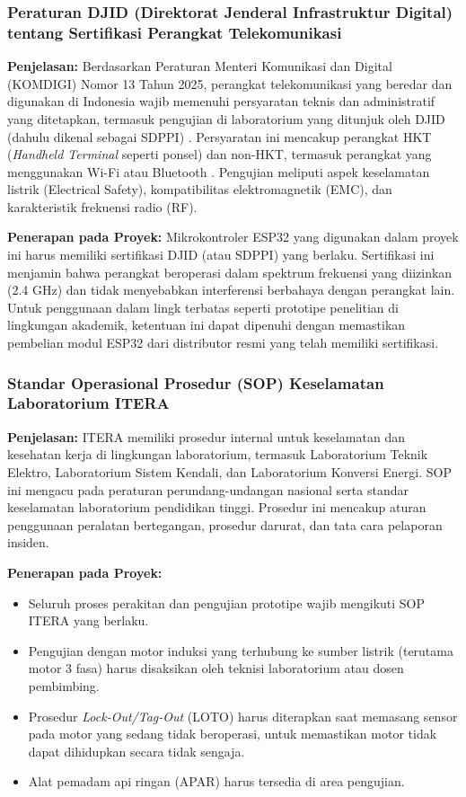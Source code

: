 \documentclass{elsinta}
\begin{document}
\subsubsection{Peraturan DJID (Direktorat Jenderal Infrastruktur Digital) tentang Sertifikasi Perangkat Telekomunikasi}

\textbf{Penjelasan:} Berdasarkan Peraturan Menteri Komunikasi dan Digital (KOMDIGI) Nomor 13 Tahun 2025, perangkat telekomunikasi yang beredar dan digunakan di Indonesia wajib memenuhi persyaratan teknis dan administratif yang ditetapkan, termasuk pengujian di laboratorium yang ditunjuk oleh DJID (dahulu dikenal sebagai SDPPI) \cite{sdppi_2025}. Persyaratan ini mencakup perangkat HKT (\textit{Handheld Terminal} seperti ponsel) dan non-HKT, termasuk perangkat yang menggunakan Wi-Fi atau Bluetooth \cite{sdppi_2025}. Pengujian meliputi aspek keselamatan listrik (Electrical Safety), kompatibilitas elektromagnetik (EMC), dan karakteristik frekuensi radio (RF).

\textbf{Penerapan pada Proyek:} Mikrokontroler ESP32 yang digunakan dalam proyek ini harus memiliki sertifikasi DJID (atau SDPPI) yang berlaku. Sertifikasi ini menjamin bahwa perangkat beroperasi dalam spektrum frekuensi yang diizinkan (2.4 GHz) dan tidak menyebabkan interferensi berbahaya dengan perangkat lain. Untuk penggunaan dalam lingk terbatas seperti prototipe penelitian di lingkungan akademik, ketentuan ini dapat dipenuhi dengan memastikan pembelian modul ESP32 dari distributor resmi yang telah memiliki sertifikasi.

\subsubsection{Standar Operasional Prosedur (SOP) Keselamatan Laboratorium ITERA}

\textbf{Penjelasan:} ITERA memiliki prosedur internal untuk keselamatan dan kesehatan kerja di lingkungan laboratorium, termasuk Laboratorium Teknik Elektro, Laboratorium Sistem Kendali, dan Laboratorium Konversi Energi. SOP ini mengacu pada peraturan perundang-undangan nasional serta standar keselamatan laboratorium pendidikan tinggi. Prosedur ini mencakup aturan penggunaan peralatan bertegangan, prosedur darurat, dan tata cara pelaporan insiden.

\textbf{Penerapan pada Proyek:}
\begin{itemize}
    \item Seluruh proses perakitan dan pengujian prototipe wajib mengikuti SOP ITERA yang berlaku.
    \item Pengujian dengan motor induksi yang terhubung ke sumber listrik (terutama motor 3 fasa) harus disaksikan oleh teknisi laboratorium atau dosen pembimbing.
    \item Prosedur \textit{Lock-Out/Tag-Out} (LOTO) harus diterapkan saat memasang sensor pada motor yang sedang tidak beroperasi, untuk memastikan motor tidak dapat dihidupkan secara tidak sengaja.
    \item Alat pemadam api ringan (APAR) harus tersedia di area pengujian.
\end{itemize}
\end{document}
